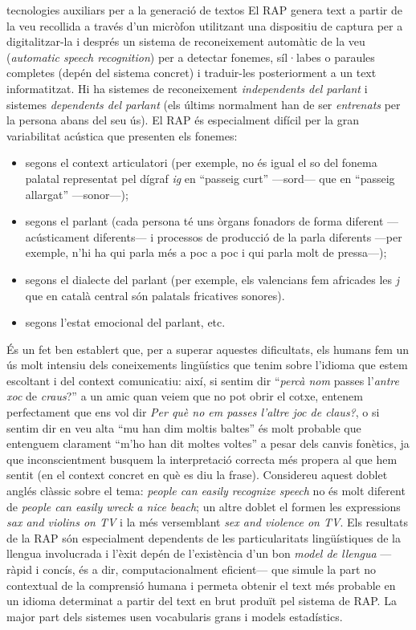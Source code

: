 \begin{persabermes}{tecnologies auxiliars per a la generació de textos}
  El RAP genera text a partir de la veu recollida a través d'un
  micròfon utilitzant una dispositiu de captura per a digitalitzar-la
  i després un sistema de reconeixement automàtic de la veu
  (\emph{automatic speech recognition}) per a detectar fonemes,
  síl·labes o paraules completes (depén del sistema concret) i
  traduir-les posteriorment a un text informatitzat.  Hi ha sistemes
  de reconeixement {\em independents del parlant} i sistemes
  \emph{dependents del parlant} (els últims normalment han de ser
  \emph{entrenats} per la persona abans del seu ús).  El RAP és
  especialment difícil per la gran variabilitat acústica que presenten
  els fonemes:
  \begin{itemize}
  \item segons el context articulatori (per exemple, no és igual el so
    del fonema palatal representat pel dígraf \emph{ig} en ``passeig
    curt'' ---sord--- que en ``passeig allargat'' ---sonor---);
  \item segons el parlant (cada persona té uns òrgans fonadors de
    forma diferent ---acústicament diferents--- i processos de
    producció de la parla diferents ---per exemple, n'hi ha qui parla
    més a poc a poc i qui parla molt de pressa---);
  \item segons el dialecte del parlant (per exemple, els valencians
    fem africades les \emph{j} que en català central són palatals
    fricatives sonores).
  \item segons l'estat emocional del parlant, etc.
  \end{itemize}
  És un fet ben establert que, per a superar aquestes dificultats, els
  humans fem un ús molt intensiu dels coneixements lingüístics que
  tenim sobre l'idioma que estem escoltant i del context comunicatiu:
  així, si sentim dir ``\emph{percà nom} passes l'\emph{antre xoc} de
  \emph{craus}?'' a un amic quan veiem que no pot obrir el cotxe,
  entenem perfectament que ens vol dir \emph{Per què no em
      passes l'altre joc de claus?}, o si sentim dir en veu alta ``mu
  han dim moltis baltes'' és molt probable que entenguem clarament
  ``m'ho han dit moltes voltes'' a pesar dels canvis fonètics, ja que
  inconscientment busquem la interpretació correcta més propera al que
  hem sentit (en el context concret en què es diu la
  frase). Considereu aquest doblet anglés clàssic sobre el
    tema: \emph{people can easily recognize speech} no és molt
    diferent de {\em people can easily wreck a nice beach}; un altre
    doblet el formen les expressions \emph{sax and violins on TV} i la
    més versemblant \emph{sex and violence on TV}. Els resultats de
  la RAP són especialment dependents de les particularitats
  lingüístiques de la llengua involucrada i l'èxit depén de
  l'existència d'un bon \emph{model de llengua} ---ràpid i concís, és
  a dir, computacionalment eficient--- que simule la part no
  contextual de la comprensió humana i permeta obtenir el text més
  probable en un idioma determinat a partir del text en brut produït
  pel sistema de RAP. La major part dels sistemes usen vocabularis
  grans i models estadístics.


\end{persabermes}
